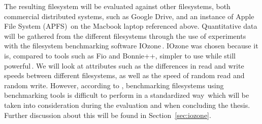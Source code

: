 The resulting filesystem will be evaluated against other filesystems, both commercial distributed systems, such as Google Drive, and an instance of Apple File System (APFS)\,\cite{appleinc.AppleFileSystem} on the Macbook laptop referenced above. Quantitative data will be gathered from the different filesystems through the use of experiments with the filesystem benchmarking software IOzone\,\cite{IozoneFilesystemBenchmark}. IOzone was chosen because it is, compared to tools such as Fio and Bonnie++, simpler to use while still powerful\,\cite{agarwalComparingIOBenchmarks2018}. We will look at attributes such as the differences in read and write speeds between different filesystems, as well as the speed of random read and random write. However, according to \citeauthor{tarasovBenchmarkingFileSystem2011}, benchmarking filesystems using benchmarking tools is difficult to perform in a standardized way\,\cite{tarasovBenchmarkingFileSystem2011} which will be taken into consideration during the evaluation and when concluding the thesis. Further discussion about this will be found in Section~\ref{sec:iozone}.